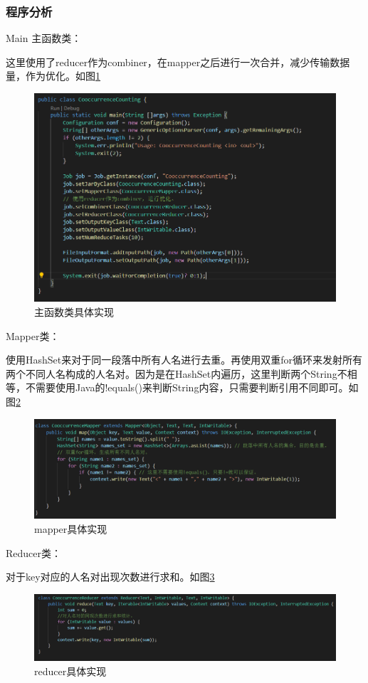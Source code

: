 \documentclass[a4paper,UTF8]{article}
\numberwithin{equation}{section}
\begin{document}
\subsubsection{程序分析}
Main 主函数类：
\par 这里使用了reducer作为combiner，在mapper之后进行一次合并，减少传输数据量，作为优化。如图\ref{task2-Main}
\begin{figure}[htbp]
	\centering
	\includegraphics[width = 15cm]{task2-Main.png}
	\caption{主函数类具体实现}
	\label{task2-Main}
\end{figure}

\par Mapper类：
\par 使用HashSet来对于同一段落中所有人名进行去重。再使用双重for循环来发射所有两个不同人名构成的人名对。因为是在HashSet内遍历，这里判断两个String不相等，不需要使用Java的!equals()来判断String内容，只需要判断引用不同即可。如图\ref{task2-mapper}
\begin{figure}[htbp]
	\centering
	\includegraphics[width = 15cm]{task2-mapper.png}
	\caption{mapper具体实现}
	\label{task2-mapper}
\end{figure}

\par Reducer类：
\par 对于key对应的人名对出现次数进行求和。如图\ref{task2-reducer}
\begin{figure}[htbp]
	\centering
	\includegraphics[width = 15cm]{task2-reducer.png}
	\caption{reducer具体实现}
	\label{task2-reducer}
\end{figure}
\end{document}
